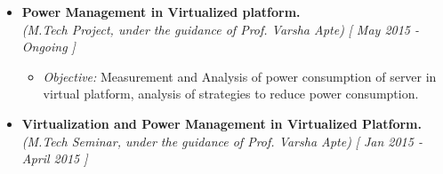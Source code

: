 \begin{itemize}
\item \textbf{Power Management in Virtualized platform.} \\
      \emph{(M.Tech Project, under the guidance of Prof. Varsha Apte)} \hfill {\emph{[ May 2015 - Ongoing ]}} \\[-0.6cm]
      \begin{itemize}
  \item \textit{Objective:} Measurement and Analysis of power consumption of server in virtual platform, analysis of strategies to reduce power consumption.\\[-0.5cm]
 	  	  

  	        \end{itemize}
\item \textbf{Virtualization and Power Management in Virtualized Platform.} \\
\emph{(M.Tech Seminar, under the guidance of Prof. Varsha Apte)} \hfill {\emph{[ Jan 2015 - April 2015 ]}} \\[-0.6cm]
\end{itemize}
